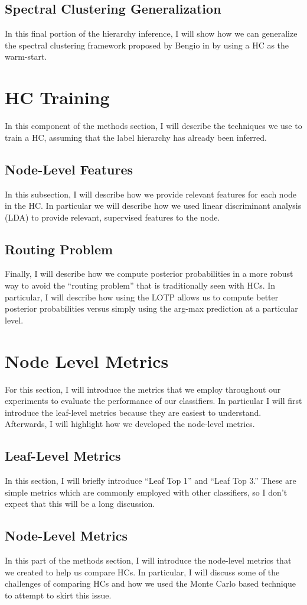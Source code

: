 \documentclass[../thesis.tex]{subfiles}
\begin{document}
\subsection{Spectral Clustering Generalization}
In this final portion of the hierarchy inference, I will show how we can generalize the spectral clustering framework proposed by Bengio in \cite{bengio2010label} by using a HC as the warm-start.

\section{HC Training}
In this component of the methods section, I will describe the techniques we use to train a HC, assuming that the label hierarchy has already been inferred.

\subsection{Node-Level Features}
In this subsection, I will describe how we provide relevant features for each node in the HC. In particular we will describe how we used linear discriminant analysis (LDA) to provide relevant, supervised features to the node.

\subsection{Routing Problem}
Finally, I will describe how we compute posterior probabilities in a more robust way to avoid the ``routing problem'' that is traditionally seen with HCs. In particular, I will describe how using the LOTP allows us to compute better posterior probabilities versus simply using the arg-max prediction at a particular level. 

\section{Node Level Metrics}
For this section, I will introduce the metrics that we employ throughout our experiments to evaluate the performance of our classifiers. In particular I will first introduce the leaf-level metrics because they are easiest to understand. Afterwards, I will highlight how we developed the node-level metrics.

\subsection{Leaf-Level Metrics}
In this section, I will briefly introduce ``Leaf Top 1'' and ``Leaf Top 3.'' These are simple metrics which are commonly employed with other classifiers, so I don't expect that this will be a long discussion.

\subsection{Node-Level Metrics}
In this part of the methods section, I will introduce the node-level metrics that we created to help us compare HCs. In particular, I will discuss some of the challenges of comparing HCs and how we used the Monte Carlo based technique to attempt to skirt this issue. 
\end{document}
